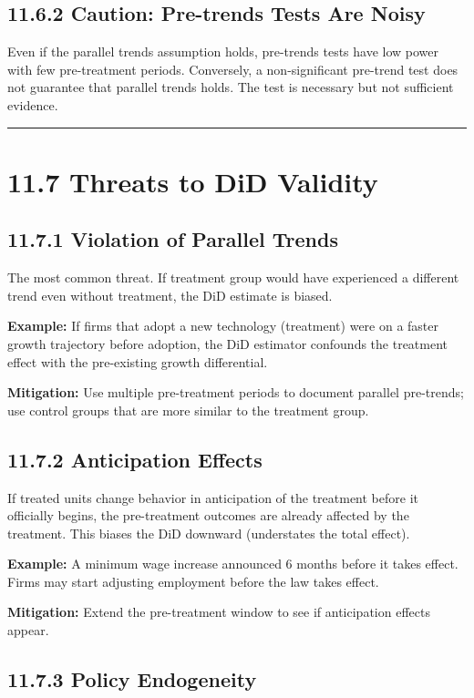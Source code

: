 \subsection{11.6.2 Caution: Pre-trends Tests Are Noisy}

Even if the parallel trends assumption holds, pre-trends tests have low power with few pre-treatment periods. Conversely, a non-significant pre-trend test does not guarantee that parallel trends holds. The test is necessary but not sufficient evidence.

\medskip\hrule\medskip

\section{11.7 Threats to DiD Validity}

\subsection{11.7.1 Violation of Parallel Trends}

The most common threat. If treatment group would have experienced a different trend even without treatment, the DiD estimate is biased.

\textbf{Example:} If firms that adopt a new technology (treatment) were on a faster growth trajectory before adoption, the DiD estimator confounds the treatment effect with the pre-existing growth differential.

\textbf{Mitigation:} Use multiple pre-treatment periods to document parallel pre-trends; use control groups that are more similar to the treatment group.

\subsection{11.7.2 Anticipation Effects}

If treated units change behavior in anticipation of the treatment before it officially begins, the pre-treatment outcomes are already affected by the treatment. This biases the DiD downward (understates the total effect).

\textbf{Example:} A minimum wage increase announced 6 months before it takes effect. Firms may start adjusting employment before the law takes effect.

\textbf{Mitigation:} Extend the pre-treatment window to see if anticipation effects appear.

\subsection{11.7.3 Policy Endogeneity}


